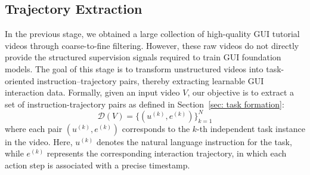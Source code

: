 \documentclass{article}
\theoremstyle{plain}
\theoremstyle{definition}
\theoremstyle{remark}
\begin{document}


\subsection{Trajectory Extraction}
\label{subsec: trajectory extraction}

In the previous stage, we obtained a large collection of high-quality GUI tutorial videos through coarse-to-fine filtering. However, these raw videos do not directly provide the structured supervision signals required to train GUI foundation models. The goal of this stage is to transform unstructured videos into task-oriented instruction–trajectory pairs, thereby extracting learnable GUI interaction data.
Formally, given an input video $V$, our objective is to extract a set of instruction-trajectory pairs as defined in Section~\ref{sec: task formation}:
\begin{equation}
    \mathcal{D}(V) = \{ (u^{(k)}, e^{(k)}) \}_{k=1}^N
\end{equation}
where each pair $(u^{(k)}, e^{(k)})$ corresponds to the $k$-th independent task instance in the video. Here, $u^{(k)}$ denotes the natural language instruction for the task, while $e^{(k)}$ represents the corresponding interaction trajectory, in which each action step is associated with a precise timestamp.
\end{document}
